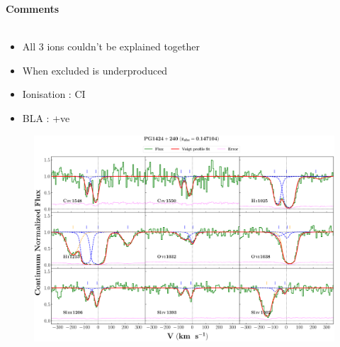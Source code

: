 \documentclass[12pt]{report}
\newcommand\ion[2]{\text{#1\,\textsc{\lowercase{#2}}}}
\begin{document}
\newpage

\textbf{Comments}
\\\\
\begin{itemize}
    \item All 3 ions couldn't be explained together
    \item When excluded \ion{O}{vi} is underproduced
    \item Ionisation : CI
    \item BLA : +ve
\end{itemize}


\newpage


\begin{landscape}

    \begin{figure}
    \centering
    \vspace{-20mm}
    \hspace*{-35mm}
    \includegraphics[width=1.25\linewidth]{System-Plots/PG1424+240_z=0.147104_sys_plot.png}
    \end{figure}
    
\end{landscape}
\end{document}
